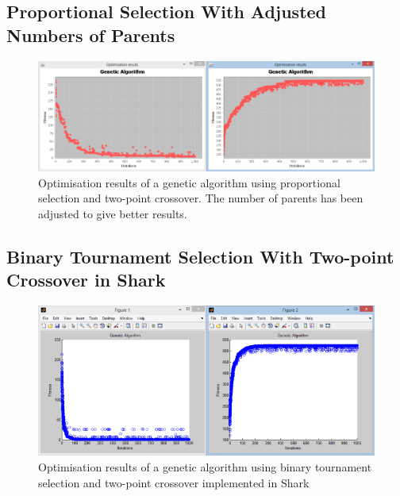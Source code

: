 \begin{landscape}
\subsection{Proportional Selection With Adjusted Numbers of Parents}
\label{sec:appendix9}
  \begin{figure}[h]
    \begin{center}
      \includegraphics{Figures/ga_fp_2p_parents}
    \end{center}
    \caption{Optimisation results of a genetic algorithm using proportional selection and two-point crossover. The number of parents has been adjusted to give better results.}
    \label{fig:phase1}
  \end{figure}
\end{landscape}

\begin{landscape}
\subsection{Binary Tournament Selection With Two-point Crossover in Shark}
\label{sec:appendix10}
  \begin{figure}[h]
    \begin{center}
      \includegraphics{Figures/sharkga}
    \end{center}
    \caption{Optimisation results of a genetic algorithm using binary tournament selection and two-point crossover implemented in Shark}
    \label{fig:phase1}
  \end{figure}
\end{landscape}

